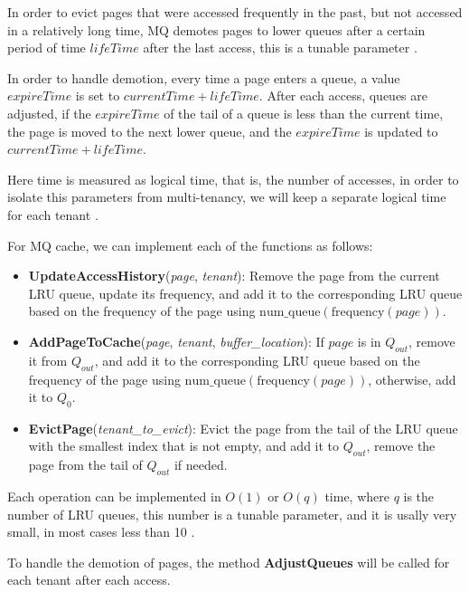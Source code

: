In order to evict pages that were accessed frequently in the past, but not accessed in a relatively long time,
MQ demotes pages to lower queues after a certain period of time $lifeTime$ after the last access, this is
a tunable parameter \cite{mq-article}.

In order to handle demotion, every time a page enters a queue, a value $expireTime$ is set to $currentTime + lifeTime$.
After each access, queues are adjusted, if the $expireTime$ of the tail of a queue is less than the current time, the page
is moved to the next lower queue, and the $expireTime$ is updated to $currentTime + lifeTime$.

Here time is measured as logical time, that is, the number of accesses, in order to isolate 
this parameters from multi-tenancy, we will keep a separate logical time for each tenant \cite{mq-article}.

For MQ cache, we can implement each of the functions as follows:

\begin{itemize}
    \item \textbf{UpdateAccessHistory}(\textit{page}, \textit{tenant}): Remove the page from the
    current LRU queue, update its frequency, and add it to the corresponding LRU queue based on the
    frequency of the page using $\text{num\_queue}(\text{frequency}(page))$.
    \item \textbf{AddPageToCache}(\textit{page}, \textit{tenant}, \textit{buffer\_location}): If 
    $page$ is in $Q_{out}$, remove it from $Q_{out}$, and add it to the corresponding LRU queue based
    on the frequency of the page using $\text{num\_queue}(\text{frequency}(page))$, otherwise, add it
    to $Q_0$.
    \item \textbf{EvictPage}(\textit{tenant\_to\_evict}): Evict the page from the tail of the LRU queue with the
    smallest index that is not empty, and add it to $Q_{out}$, remove the page from the tail of $Q_{out}$ if needed.
\end{itemize}

Each operation can be implemented in $O(1)$ or $O(q)$ time, where $q$ is the number of LRU queues,
this number is a tunable parameter, and it is usally very small, in most cases less than 10 \cite{mq-article}.

To handle the demotion of pages, the method \textbf{AdjustQueues} will be called for each tenant after each access.

